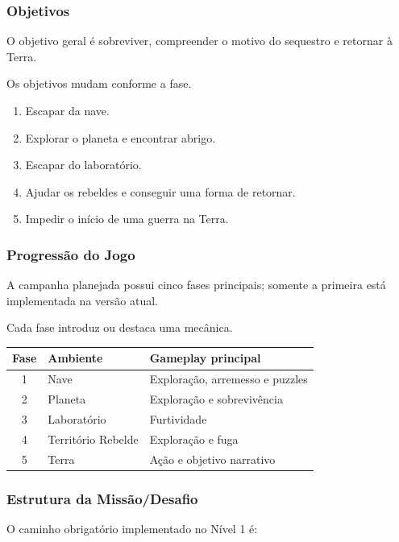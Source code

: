 \documentclass[12pt,a4paper]{article}
\begin{document}
\subsubsection{Objetivos}

O objetivo geral é sobreviver, compreender o motivo do sequestro e
retornar à Terra.

Os objetivos mudam conforme a fase.

\begin{enumerate}
    \item Escapar da nave.
    \item Explorar o planeta e encontrar abrigo.
    \item Escapar do laboratório.
    \item Ajudar os rebeldes e conseguir uma forma de retornar.
    \item Impedir o início de uma guerra na Terra.
\end{enumerate}

\subsubsection{Progressão do Jogo}

A campanha planejada possui cinco fases principais; somente a primeira
está implementada na versão atual.

Cada fase introduz ou destaca uma mecânica.

\begin{center}
\begin{tabularx}{\textwidth}{|c|X|X|}
\hline
\textbf{Fase} & \textbf{Ambiente} & \textbf{Gameplay principal}\\
\hline
1 & Nave & Exploração, arremesso e puzzles\\
\hline
2 & Planeta & Exploração e sobrevivência\\
\hline
3 & Laboratório & Furtividade\\
\hline
4 & Território Rebelde & Exploração e fuga\\
\hline
5 & Terra & Ação e objetivo narrativo\\
\hline
\end{tabularx}
\end{center}

\subsubsection{Estrutura da Missão/Desafio}

O caminho obrigatório implementado no Nível 1 é:
\end{document}
